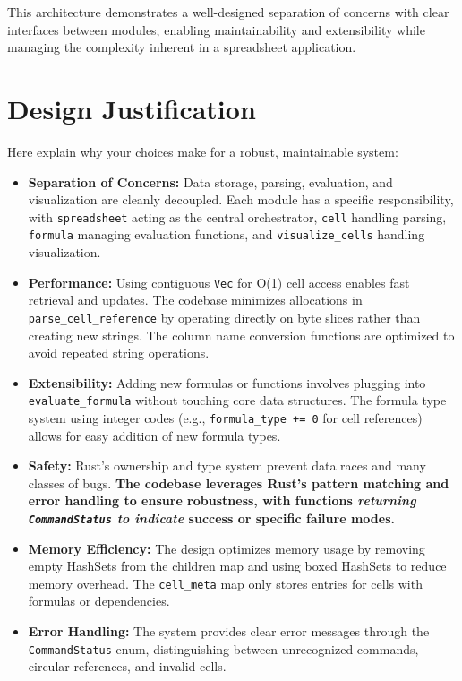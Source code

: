\documentclass[11pt,a4paper]{article}
\begin{document}
This architecture demonstrates a well-designed separation of concerns with clear interfaces between modules, enabling maintainability and extensibility while managing the complexity inherent in a spreadsheet application.



\section{Design Justification}
\label{sec:justification}

Here explain why your choices make for a robust, maintainable system:

\begin{itemize}
  \item \textbf{Separation of Concerns:} Data storage, parsing, evaluation, and visualization are cleanly decoupled. Each module has a specific responsibility, with \texttt{spreadsheet} acting as the central orchestrator, \texttt{cell} handling parsing, \texttt{formula} managing evaluation functions, and \texttt{visualize\_cells} handling visualization.
  
  \item \textbf{Performance:} Using contiguous \lstinline{Vec} for O(1) cell access enables fast retrieval and updates. The codebase minimizes allocations in \lstinline{parse_cell_reference} by operating directly on byte slices rather than creating new strings. The column name conversion functions are optimized to avoid repeated string operations.
  
  \item \textbf{Extensibility:} Adding new formulas or functions involves plugging into \lstinline{evaluate_formula} without touching core data structures. The formula type system using integer codes (e.g., \lstinline{formula_type += 0} for cell references) allows for easy addition of new formula types.
  
  \item \textbf{Safety:} Rust's ownership and type system prevent data races and many classes of bugs. \textbf{The codebase leverages Rust's pattern matching and error handling to ensure robustness, with functions \textit{returning \lstinline{CommandStatus} to indicate} success or specific failure modes.}
  
  \item \textbf{Memory Efficiency:} The design optimizes memory usage by removing empty HashSets from the children map and using boxed HashSets to reduce memory overhead. The \lstinline{cell_meta} map only stores entries for cells with formulas or dependencies.
  
  \item \textbf{Error Handling:} The system provides clear error messages through the \lstinline{CommandStatus} enum, distinguishing between unrecognized commands, circular references, and invalid cells.
\end{itemize}
\end{document}
